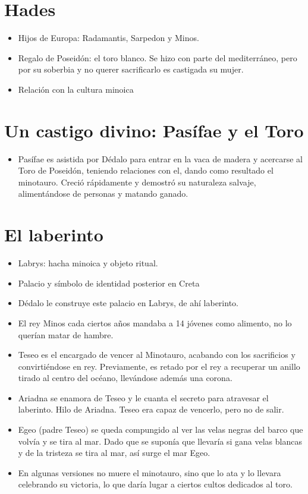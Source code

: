 \section{Hades}
\begin{itemize}
	\item Hijos de Europa: Radamantis, Sarpedon y Minos.
	\item Regalo de Poseidón: el toro blanco. Se hizo con parte del mediterráneo, pero por su soberbia y no querer sacrificarlo es castigada su mujer.
	\item Relación con la cultura minoica
\end{itemize}

\section{Un castigo divino: Pasífae y el Toro}
\begin{itemize}
	\item Pasífae es asistida por Dédalo para entrar en la vaca de madera y acercarse al Toro de Poseidón, teniendo relaciones con el, dando como resultado el minotauro. Creció rápidamente y demostró su naturaleza salvaje, alimentándose de personas y matando ganado.
\end{itemize}

\section{El laberinto}
\begin{itemize}
	\item Labrys: hacha minoica y objeto ritual.
	\item Palacio y símbolo de identidad posterior en Creta
	\item Dédalo le construye este palacio en Labrys, de ahí laberinto.
	\item El rey Minos cada ciertos años mandaba a 14 jóvenes como alimento, no lo querían matar de hambre.
	\item Teseo es el encargado de vencer al Minotauro, acabando con los sacrificios y convirtiéndose en rey. Previamente, es retado por el rey a recuperar un anillo tirado al centro del océano, llevándose además una corona.
	\item Ariadna se enamora de Teseo  y le cuanta el secreto para atravesar el laberinto. Hilo de Ariadna. Teseo era capaz de vencerlo, pero no de salir.
	\item Egeo (padre Teseo) se queda compungido al ver las velas negras del barco que volvía y se tira al mar. Dado que se suponía que llevaría si gana velas blancas y de la tristeza se tira al mar, así surge el mar Egeo.
	\item En algunas versiones no muere el minotauro, sino que lo ata y lo llevara celebrando su victoria, lo que daría lugar a ciertos cultos dedicados al toro.
\end{itemize}

